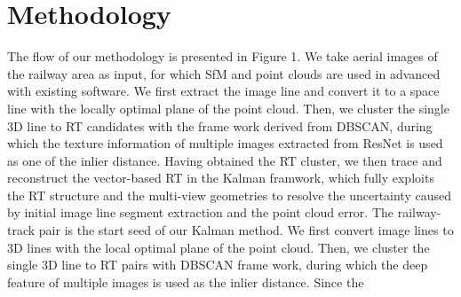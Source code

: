 \section{Methodology}

The flow of our methodology is presented in Figure 1.
We take aerial images of the railway area as input,
for which SfM and point clouds are used in advanced with existing software.
We first extract the image line and convert it to a space line with the locally optimal plane of the point cloud.
Then,
we cluster the single 3D line to RT candidates with the frame work derived from DBSCAN,  
during which the texture information of multiple images extracted from ResNet is used as one of the inlier distance.
Having obtained the RT cluster, 
we then trace and reconstruct the vector-based RT in the Kalman framwork,
which fully exploits the RT structure and the multi-view geometries to resolve the uncertainty caused by initial image line segment extraction and the point cloud error.
The railway-track pair is the start seed of our Kalman method.
We first convert image lines to 3D lines with the local optimal plane of the point cloud.
Then,
we cluster the single 3D line to RT pairs with DBSCAN frame work,  
during which the deep feature of multiple images is used as the inlier distance.
Since the 




